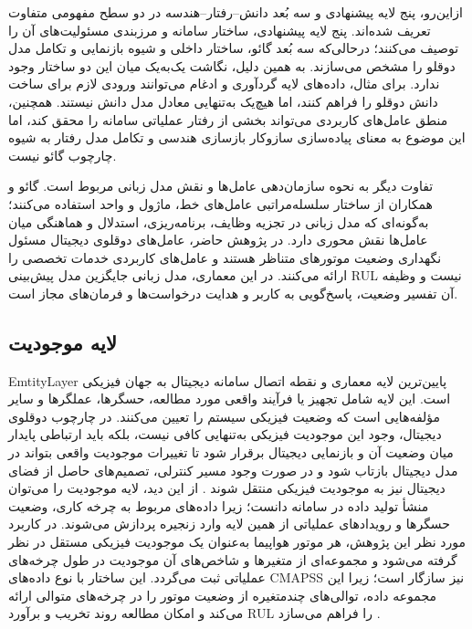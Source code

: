 ازاین‌رو، پنج لایه پیشنهادی و سه بُعد دانش--رفتار--هندسه
در دو سطح مفهومی متفاوت تعریف شده‌اند. پنج لایه
پیشنهادی، ساختار سامانه و مرزبندی مسئولیت‌های آن را
توصیف می‌کنند؛ درحالی‌که سه بُعد گائو، ساختار داخلی
و شیوه بازنمایی و تکامل مدل دوقلو را مشخص می‌سازند.
به همین دلیل، نگاشت یک‌به‌یک میان این دو ساختار
وجود ندارد. برای مثال، داده‌های لایه گردآوری و ادغام
می‌توانند ورودی لازم برای ساخت دانش دوقلو را فراهم
کنند، اما هیچ‌یک به‌تنهایی معادل مدل دانش نیستند.
همچنین، منطق عامل‌های کاربردی می‌تواند بخشی از
رفتار عملیاتی سامانه را محقق کند، اما این موضوع
به معنای پیاده‌سازی سازوکار بازسازی هندسی و
تکامل مدل رفتار به شیوه چارچوب گائو نیست.

تفاوت دیگر به نحوه سازمان‌دهی عامل‌ها و نقش مدل
زبانی مربوط است. گائو و همکاران از ساختار سلسله‌مراتبی
عامل‌های خط، ماژول و واحد استفاده می‌کنند؛ به‌گونه‌ای
که مدل زبانی در تجزیه وظایف، برنامه‌ریزی، استدلال
و هماهنگی میان عامل‌ها نقش محوری دارد. در پژوهش
حاضر، عامل‌های دوقلوی دیجیتال مسئول نگهداری وضعیت
موتورهای متناظر هستند و عامل‌های کاربردی خدمات
تخصصی را ارائه می‌کنند. در این معماری، مدل زبانی
جایگزین مدل پیش‌بینی \gls{RUL} نیست و وظیفه آن تفسیر وضعیت، پاسخ‌گویی به کاربر
و هدایت درخواست‌ها و فرمان‌های مجاز است.


\subsection{لایه موجودیت}
\label{sec:layer-entity}

\gls{EmtityLayer} پایین‌ترین لایه معماری و نقطه اتصال سامانه دیجیتال به جهان فیزیکی است. این لایه شامل تجهیز یا فرآیند واقعی مورد مطالعه، حسگرها، عملگرها و سایر مؤلفه‌هایی است که وضعیت فیزیکی سیستم را تعیین می‌کنند. در چارچوب دوقلوی دیجیتال، وجود این موجودیت فیزیکی به‌تنهایی کافی نیست، بلکه باید ارتباطی پایدار میان وضعیت آن و بازنمایی دیجیتال برقرار شود تا تغییرات موجودیت واقعی بتواند در مدل دیجیتال بازتاب شود و در صورت وجود مسیر کنترلی، تصمیم‌های حاصل از فضای دیجیتال نیز به موجودیت فیزیکی منتقل شوند \cite{tao2019digital,barricelli2019survey,fuller2020digital}.
 از این دید، لایه موجودیت را می‌توان منشأ تولید داده در سامانه دانست؛ زیرا داده‌های مربوط به چرخه کاری، وضعیت حسگرها و رویدادهای عملیاتی از همین لایه وارد زنجیره پردازش می‌شوند. در کاربرد مورد نظر این پژوهش، هر موتور هواپیما به‌عنوان یک موجودیت فیزیکی مستقل در نظر گرفته می‌شود و مجموعه‌ای از متغیرها و شاخص‌های آن موجودیت در طول چرخه‌های عملیاتی ثبت می‌گردد. این ساختار با نوع داده‌های \gls{CMAPSS} نیز سازگار است؛ زیرا این مجموعه داده، توالی‌های چندمتغیره از وضعیت موتور را در چرخه‌های متوالی ارائه می‌کند و امکان مطالعه روند تخریب و برآورد \gls{RUL} را فراهم می‌سازد \cite{NASA2007C-MAPSS}.

